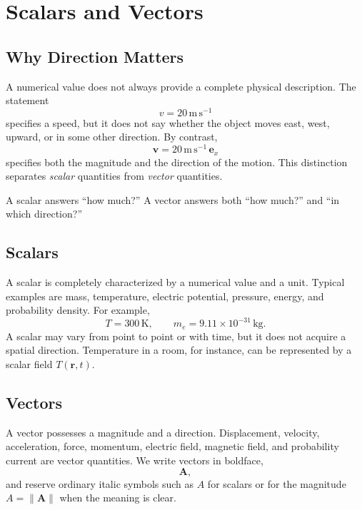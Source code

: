 \section{Scalars and Vectors}
\label{sec:scalars-vectors}

\subsection{Why Direction Matters}

A numerical value does not always provide a complete physical description. The
statement
\[
v=20\,\mathrm{m\,s^{-1}}
\]
specifies a speed, but it does not say whether the object moves east, west,
upward, or in some other direction. By contrast,
\[
\mathbf v=20\,\mathrm{m\,s^{-1}}\,\mathbf e_x
\]
specifies both the magnitude and the direction of the motion. This distinction
separates \emph{scalar} quantities from \emph{vector} quantities.

\begin{bookinsight}
A scalar answers ``how much?'' A vector answers both ``how much?'' and ``in
which direction?''
\end{bookinsight}

\subsection{Scalars}

A scalar is completely characterized by a numerical value and a unit. Typical
examples are mass, temperature, electric potential, pressure, energy, and
probability density. For example,
\[
T=300\,\mathrm{K},
\qquad
m_e=9.11\times10^{-31}\,\mathrm{kg}.
\]
A scalar may vary from point to point or with time, but it does not acquire a
spatial direction. Temperature in a room, for instance, can be represented by
a scalar field $T(\mathbf r,t)$.

\subsection{Vectors}

A vector possesses a magnitude and a direction. Displacement, velocity,
acceleration, force, momentum, electric field, magnetic field, and probability
current are vector quantities. We write vectors in boldface,
\[
\mathbf A,
\]
and reserve ordinary italic symbols such as $A$ for scalars or for the
magnitude $A=\lVert\mathbf A\rVert$ when the meaning is clear.


